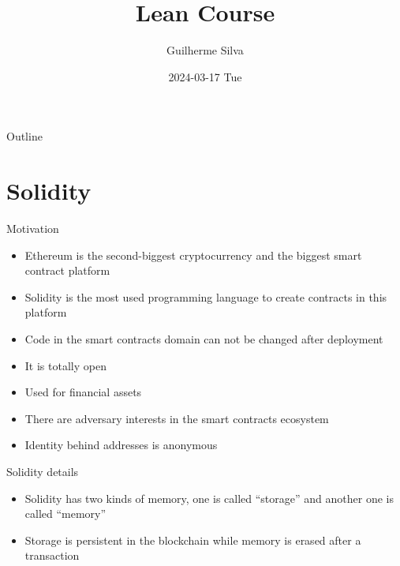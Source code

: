 \documentclass[bigger]{beamer}
\author{Guilherme Silva}
\date{2024-03-17 Tue}
\title{Lean Course}
\begin{document}
\maketitle
\begin{frame}{Outline}
\tableofcontents
\end{frame}

\section{Solidity}
\label{sec:org7f95225}
\begin{frame}[label={sec:orgb9338a5}]{Motivation}
\begin{itemize}
\item Ethereum is the second-biggest cryptocurrency and the biggest smart contract platform
\item Solidity is the most used programming language to create contracts in this platform
\item Code in the smart contracts domain can not be changed after deployment
\item It is totally open
\item Used for financial assets
\item There are adversary interests in the smart contracts ecosystem
\item Identity behind addresses is anonymous
\end{itemize}
\end{frame}
\begin{frame}[label={sec:orge8ebc6c}]{Solidity details}
\begin{itemize}
\item Solidity has two kinds of memory, one is called ``storage'' and another one is called ``memory''
\item Storage is persistent in the blockchain while memory is erased after a transaction
\end{itemize}
\end{frame}
\end{document}

